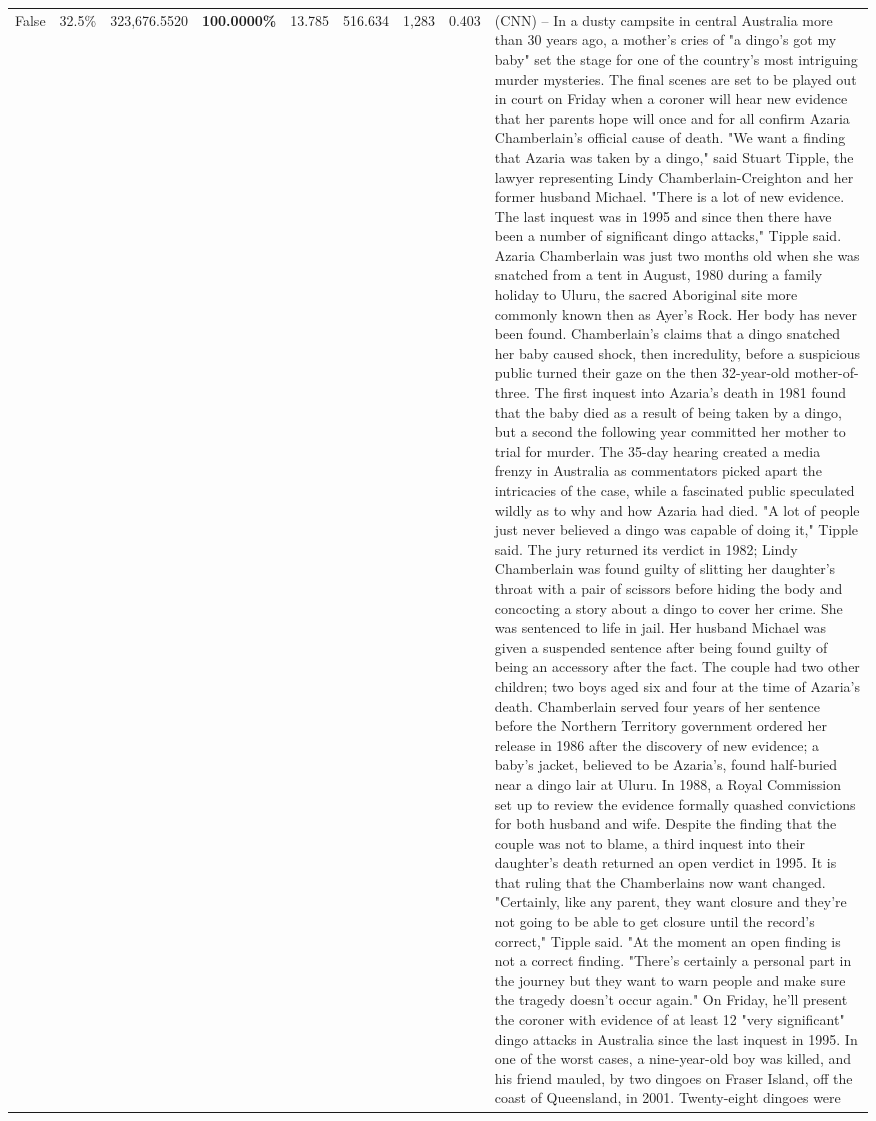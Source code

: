 \begin{table}[H]
\begin{tabular}{lllrlllll}
False & 32.5\% & 323,676.5520 & \bfseries \color{red} 100.0000\% & 13.785 & 516.634 & 1,283 & 0.403 & (CNN) -- In a dusty campsite in central Australia more than 30 years ago, a mother's cries of "a dingo's got my baby" set the stage for one of the country's most intriguing murder mysteries. The final scenes are set to be played out in court on Friday when a coroner will hear new evidence that her parents hope will once and for all confirm Azaria Chamberlain's official cause of death. "We want a finding that Azaria was taken by a dingo," said Stuart Tipple, the lawyer representing Lindy Chamberlain-Creighton and her former husband Michael. "There is a lot of new evidence. The last inquest was in 1995 and since then there have been a number of significant dingo attacks," Tipple said. Azaria Chamberlain was just two months old when she was snatched from a tent in August, 1980 during a family holiday to Uluru, the sacred Aboriginal site more commonly known then as Ayer's Rock. Her body has never been found. Chamberlain's claims that a dingo snatched her baby caused shock, then incredulity, before a suspicious public turned their gaze on the then 32-year-old mother-of-three. The first inquest into Azaria's death in 1981 found that the baby died as a result of being taken by a dingo, but a second the following year committed her mother to trial for murder. The 35-day hearing created a media frenzy in Australia as commentators picked apart the intricacies of the case, while a fascinated public speculated wildly as to why and how Azaria had died. "A lot of people just never believed a dingo was capable of doing it," Tipple said. The jury returned its verdict in 1982; Lindy Chamberlain was found guilty of slitting her daughter's throat with a pair of scissors before hiding the body and concocting a story about a dingo to cover her crime. She was sentenced to life in jail. Her husband Michael was given a suspended sentence after being found guilty of being an accessory after the fact. The couple had two other children; two boys aged six and four at the time of Azaria's death. Chamberlain served four years of her sentence before the Northern Territory government ordered her release in 1986 after the discovery of new evidence; a baby's jacket, believed to be Azaria's, found half-buried near a dingo lair at Uluru. In 1988, a Royal Commission set up to review the evidence formally quashed convictions for both husband and wife. Despite the finding that the couple was not to blame, a third inquest into their daughter's death returned an open verdict in 1995. It is that ruling that the Chamberlains now want changed. "Certainly, like any parent, they want closure and they're not going to be able to get closure until the record's correct," Tipple said. "At the moment an open finding is not a correct finding. "There's certainly a personal part in the journey but they want to warn people and make sure the tragedy doesn't occur again." On Friday, he'll present the coroner with evidence of at least 12 "very significant" dingo attacks in Australia since the last inquest in 1995. In one of the worst cases, a nine-year-old boy was killed, and his friend mauled, by two dingoes on Fraser Island, off the coast of Queensland, in 2001. Twenty-eight dingoes were 
\end{tabular}
\end{table}
